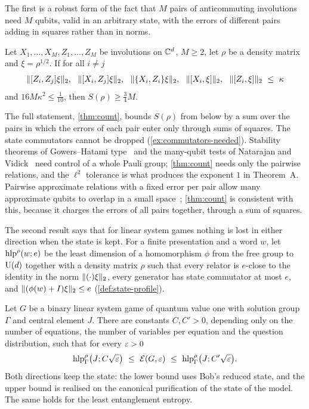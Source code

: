 The first is a robust form of the fact that $M$ pairs of anticommuting involutions need $M$ qubits, valid in an arbitrary state, with the
errors of different pairs adding in squares rather than in norms.

\begin{theoremC}
Let $X_1,\dots,X_M,Z_1,\dots,Z_M$ be involutions on $\mathbb C^d$, $M\ge2$, let $\rho$ be a density matrix and $\xi=\rho^{1/2}$. If for all $i\ne j$
\[
\hs{[Z_i,Z_j]\xi},\ \ \hs{[X_i,Z_j]\xi},\ \ \hs{\{X_i,Z_i\}\xi},\ \ \hs{[X_i,\xi]},\ \ \hs{[Z_i,\xi]}\ \le\ \kappa
\]
and $16M\kappa^2\le\frac1{10}$, then $S(\rho)\ge\frac34M$.
\end{theoremC}

The full statement, \cref{thm:count}, bounds $S(\rho)$ from below by a sum over the pairs in which the errors of each pair enter only through sums of
squares. The state commutators cannot be dropped (\cref{ex:commutators-needed}). Stability theorems of Gowers--Hatami type~\cite{GH17} and the
many-qubit tests of Natarajan and Vidick~\cite{NV17} need control of a whole Pauli group; \cref{thm:count} needs only the pairwise relations,
and the $\ell^2$ tolerance is what produces the exponent $1$ in Theorem~A. Pairwise approximate relations with a fixed error per pair allow many
approximate qubits to overlap in a small space~\cite{CRSV17}; \cref{thm:count} is consistent with this, because it charges the errors of all
pairs together, through a sum of squares.

The second result says that for linear system games nothing is lost in either direction when the state is kept. For a finite presentation
and a word $w$, let $\operatorname{hlp}^{\rho}(w;e)$ be the least dimension of a homomorphism $\phi$ from the free group to $\mathrm U(d)$ together with a density
matrix $\rho$ such that every relator is $e$-close to the identity in the norm $\lVert (\cdot)\xi\rVert_2$, every generator has state commutator at
most $e$, and $\lVert (\phi(w)+I)\xi\rVert_2\le e$ (\cref{def:state-profile}).

\begin{theoremD}
Let $G$ be a binary linear system game of quantum value one with solution group $\Gamma$ and central element $J$. There are constants
$C,C'>0$, depending only on the number of equations, the number of variables per equation and the question distribution, such that for
every $\varepsilon>0$
\[
\hlps_\Gamma\bigl(J;C\sqrt\eps\bigr)\ \le\ \Ent(G,\eps)\ \le\ \hlps_\Gamma\bigl(J;C'\sqrt\eps\bigr).
\]
Both directions keep the state: the lower bound uses Bob's reduced state, and the upper bound is realised on the canonical purification of
the state of the model. The same holds for the least entanglement entropy.
\end{theoremD}

